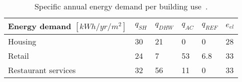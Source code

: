 \begin{table}[htp]
	\centering
	\caption{Specific annual energy demand per building use~\cite{girardinEnerGisGeographicalInformation2010}.}
	\label{tab:specificE}
	\begin{tabular}{llllll}
		\toprule
		Energy demand $[kWh/yr/m^2]$ & $q_{SH}$ & $q_{DHW}$ & $q_{AC}$ & $q_{REF}$ & $e_{el}$ \\ \midrule
		Housing & 30 & 21 & 0 & 0 & 28 \\
		Retail & 24 & 7 & 53 & 6.8 & 33 \\
		Restaurant services & 32 & 56 & 11 & 0 & 33 \\
		 \bottomrule
	\end{tabular}
\end{table}